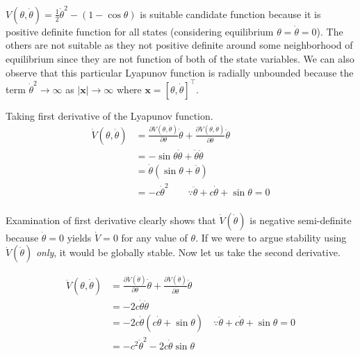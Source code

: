 \documentclass[12pt, a4paper]{article}
\begin{document}
$V(\theta,\dot{\theta})=\frac{1}{2}\dot{\theta}^{2}-(1-\cos\theta)$ is suitable candidate function because it is positive definite function for all states (considering equilibrium $\theta=\dot{\theta}=0$). The others are not suitable as they not positive definite around some neighborhood of equilibrium since they are not function of both of the state variables. We can also observe that this particular Lyapunov function is radially unbounded because the term $\dot{\theta}^{2}\rightarrow\infty$ as $|\bm{x}|\rightarrow\infty$ where $\bm{x}=[\theta,\dot{\theta}]^{\intercal}$.
 
Taking first derivative of the Lyapunov function.
\begin{equation*}
    \begin{split}
        \dot{V}(\theta,\dot{\theta})&=\frac{\partial V(\theta,\dot{\theta})}{\partial\theta}\dot{\theta}+\frac{\partial V(\theta,\dot{\theta})}{\partial\dot{\theta}}\ddot{\theta}\\
        &=-\sin{\theta}\dot{\theta}+\dot{\theta}\ddot{\theta}\\
        &=\dot{\theta}(\sin{\theta}+\ddot{\theta})\\
        &=-c\dot{\theta}^{2}\quad\quad\because\ddot{\theta}+c\dot{\theta}+\sin\theta = 0\\
    \end{split}
\end{equation*}

Examination of first derivative clearly shows that $\dot{V}(\dot{\theta})$ is negative semi-definite because $\dot{\theta}=0$ yields $\dot{V}=0$ for any value of $\theta$. If we were to argue stability using $\dot{V}(\dot{\theta})$ \textit{only}, it would be globally stable. Now let us take the second derivative.

\begin{equation*}
    \begin{split}
        \ddot{V}(\theta,\dot{\theta})&=\frac{\partial\dot{V}(\dot{\theta})}{\partial\theta}\dot{\theta}+\frac{\partial\dot{V}(\dot{\theta})}{\partial\dot{\theta}}\ddot{\theta}\\
        &=-2c\dot{\theta}\ddot{\theta}\\
        &=-2c\dot{\theta}(c\dot{\theta}+\sin{\theta})\quad\because\ddot{\theta}+c\dot{\theta}+\sin\theta = 0\\
        &=-c^{2}\dot{\theta}^{2}-2c\dot{\theta}\sin{\theta}\\
    \end{split}
\end{equation*}
\end{document}
